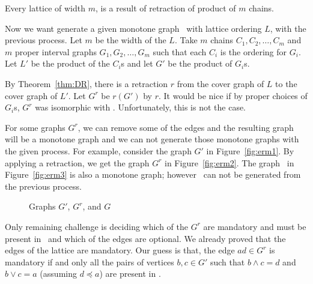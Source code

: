 \begin{cor}
Every lattice of width \(m\), is a result of retraction of product of
\(m\) chains.
\end{cor}

Now we want generate a given monotone graph \mG\ with lattice ordering \(L\),
with the previous process. Let \(m\) be the width of the \(L\)\@.
Take \(m\) chains \(C_1,C_2,\dotsc,C_m\) and \(m\) proper interval graphs
\(G_1,G_2,\dotsc,G_m\) such that each \(C_i\) is the ordering for
\(G_i\)\@.
Let \(L'\) be the product of the \(C_i\)s and let \(G'\)
be the product of \(G_i\)s.

By Theorem~\ref{thm:DR}, there is a retraction \(r\) from the
cover graph of \(L\) to the cover graph of \(L'\)\@.
Let \(G^r\) be \(r(G')\) by \(r\)\@.
It would be nice if by proper choices of \(G_i\)s, \(G^r\)
was isomorphic with \mG\@. Unfortunately, this is not the case.

For some graphs \(G^r\), we can remove some of the edges and
the resulting graph will be a monotone graph and we can not generate those monotone
graphs with the given process. For example, consider the graph \(G'\) in
Figure~\ref{fig:erm1}\@. By applying a retraction, we get the
graph \(G^r\) in Figure~\ref{fig:erm2}\@. The graph
\mG\ in Figure~\ref{fig:erm3} is also a monotone graph; however
\mG\ can not be generated from the previous process\@.


\begin{figure}
\hfill
\subfigure[\ensuremath{G'}]{\label{fig:erm1}}\hfill 
\subfigure[\ensuremath{G^r}]{\label{fig:erm2}}\hfill 
\subfigure[\ensuremath{G}]{\label{fig:erm3}}\hfill 
\caption{Graphs \ensuremath{G'}, \ensuremath{G^r}, and \ensuremath{G}}
\end{figure}

Only remaining challenge is deciding which of the \(G^r\) are mandatory 
and must be present in \mG\ and which of the edges are optional.
We already proved that the edges of the lattice are mandatory.
Our guess is that, the edge \(ad \in G^r\) is mandatory if and only
all the pairs of vertices \(b,c \in G'\) such that \(b\wedge c = d\)
and \(b \vee c = a\) (assuming \(d \preceq a\)) are present in \mG\@.
